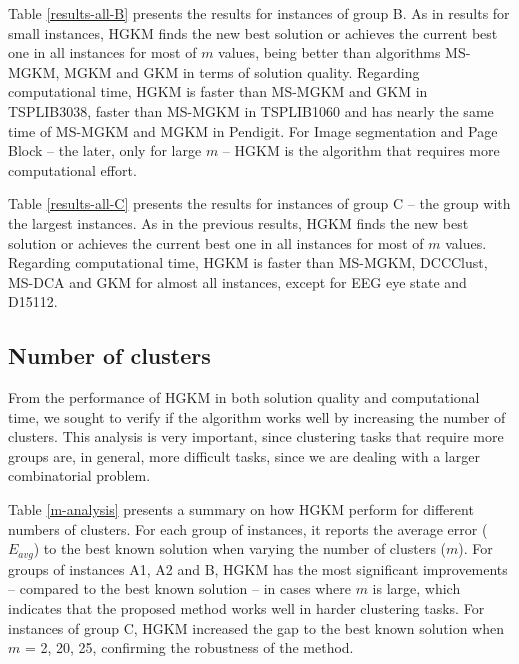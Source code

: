 Table \ref{results-all-B} presents the results for instances of group B. As in results for small instances, HGKM finds the new best solution or achieves the current best one in all instances for most of $m$ values, being better than algorithms MS-MGKM, MGKM and GKM in terms of solution quality. Regarding computational time, HGKM is faster than MS-MGKM and GKM in TSPLIB3038, faster than MS-MGKM in TSPLIB1060 and has nearly the same time of MS-MGKM and MGKM in Pendigit. For Image segmentation and Page Block -- the later, only for large $m$ -- HGKM is the algorithm that requires more computational effort.

Table \ref{results-all-C} presents the results for instances of group C -- the group with the largest instances. As in the previous results, HGKM finds the new best solution or achieves the current best one in all instances for most of $m$ values. Regarding computational time, HGKM is faster than MS-MGKM, DCCClust, MS-DCA and GKM for almost all instances, except for EEG eye state and D15112.









\subsection{Number of clusters}
From the performance of HGKM in both solution quality and computational time, we sought to verify if the algorithm works well by increasing the number of clusters. This analysis is very important, since clustering tasks that require more groups are, in general, more difficult tasks, since we are dealing with a larger combinatorial problem.

Table \ref{m-analysis} presents a summary on how HGKM perform for different numbers of clusters.
For each group of instances, it reports the average error ($E_{avg}$) to the best known solution when varying the number of clusters ($m$). For groups of instances A1, A2 and B, HGKM has the most significant improvements -- compared to the best known solution -- in cases where $m$ is large, which indicates that the proposed method works well in harder clustering tasks. For instances of group C, HGKM increased the gap to the best known solution when $m$ = 2, 20, 25, confirming the robustness of the method.




